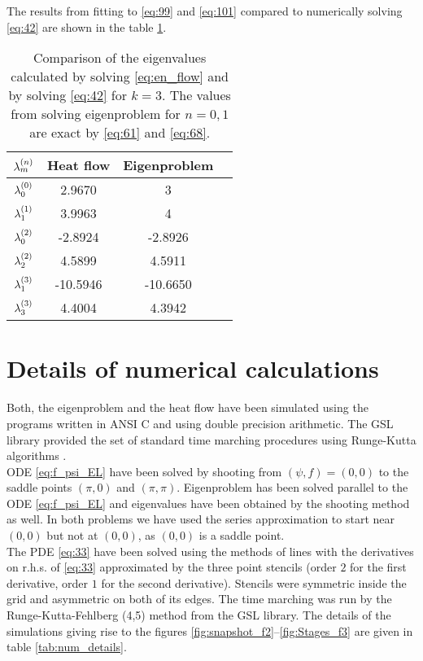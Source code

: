 The results from fitting to \eqref{eq:99} and \eqref{eq:101} compared
to numerically solving \eqref{eq:42} are shown in the table
\ref{tab:Lambda_comp}.

\begin{table}[h]
  \centering
  \begin{tabular}{| c | c | c | c |}\hline
    $\lb{n}{m}$ & Heat flow & Eigenproblem \\\hline
    $\lb{0}{0}$ & 2.9670        & 3            \\\hline
    $\lb{1}{1}$ & 3.9963        & 4            \\\hline
    $\lb{2}{0}$ & -2.8924       & -2.8926      \\\hline
    $\lb{2}{2}$ & 4.5899        & 4.5911       \\\hline
    $\lb{3}{1}$ & -10.5946      & -10.6650     \\\hline
    $\lb{3}{3}$ & 4.4004        & 4.3942       \\\hline
  \end{tabular}
  \caption{Comparison of the eigenvalues calculated by solving
    \eqref{eq:en_flow} and by solving \eqref{eq:42} for $k=3$. The
    values from solving eigenproblem for $n=0,1$ are exact by
    \eqref{eq:61} and \eqref{eq:68}.}
  \label{tab:Lambda_comp}
\end{table}


\section{Details of numerical calculations}
\label{sec:deta-numer-calc}

Both, the eigenproblem and the heat flow have been simulated using
the programs written in ANSI C and using double precision
arithmetic. The GSL library provided the set of standard time marching
procedures using Runge-Kutta algorithms \cite{Galassi}.\\

ODE \eqref{eq:f_psi_EL} have been solved by shooting from
$(\psi,f)=(0,0)$ to the saddle points $(\pi,0)$ and $(\pi,\pi)$.
Eigenproblem has been solved parallel to the ODE \eqref{eq:f_psi_EL}
and eigenvalues have been obtained by the shooting method as well. In
both problems we have used the series approximation to start near
$(0,0)$ but not at $(0,0)$, as $(0,0)$ is a saddle point.\\

The PDE \eqref{eq:33} have been solved using the methods of lines with
the derivatives on r.h.s. of \eqref{eq:33} approximated by the three
point stencils (order $2$ for the first derivative, order $1$ for the
second derivative). Stencils were symmetric inside the grid and
asymmetric on both of its edges. The time marching was run by the
Runge-Kutta-Fehlberg (4,5) method from the GSL
library\cite{Galassi}. The details of the simulations giving rise to
the figures \ref{fig:snapshot_f2}--\ref{fig:Stages_f3} are given in
table \ref{tab:num_details}.



